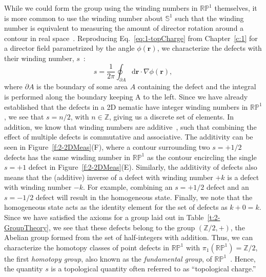 While we could form the group using the winding numbers in $\mathbb{R}\mathbb{P}^1$ themselves, it is more common to use the winding number about $\mathbb{S}^1$ such that the winding number is equivalent to measuring the amount of director rotation around a contour in real space~\cite{RN23,RN153,RN203}.
Reproducing Eq.~\ref{eq:1-topCharge} from Chapter~\ref{c:1} for a director field parametrized by the angle $\phi(\mathbf{r})$, we characterize the defects with their winding number, $s$~\cite{RN153,RN236}:
\begin{equation}
  s = \frac{1}{2 \pi}\oint_{\partial A} \textrm{d}\mathbf{r} \cdot \nabla\phi(\mathbf{r}),\label{eq:2-topCharge}
\end{equation}
where $\partial A$ is the boundary of some area $A$ containing the defect and the integral is performed along the boundary keeping A to the left.
Since we have already established that the defects in a 2D nematic have integer winding numbers in $\mathbb{R}\mathbb{P}^1$, we see that $s = n/2$, with $n \in \mathbb{Z}$, giving us a discrete set of elements.
In addition, we know that winding numbers are additive~\cite{RN196}, such that combining the effect of multiple defects is commutative and associative.
The additivity can be seen in Figure~\ref{f:2-2DMeas}(F), where a contour surrounding two $s = +1/2$ defects has the same winding number in $\mathbb{R}\mathbb{P}^1$ as the contour encircling the single $s = +1$ defect in Figure~\ref{f:2-2DMeas}(E).
Similarly, the additivity of defects also means that the (additive) inverse of a defect with winding number $+k$ is a defect with winding number $-k$.
For example, combining an $s = +1/2$ defect and an $s = -1/2$ defect will result in the homogeneous state.
Finally, we note that the homogeneous state acts as the identity element for the set of defects as $k + 0 = k$.
Since we have satisfied the axioms for a group laid out in Table~\ref{t:2-GroupTheory}, we see that these defects belong to the group $(\mathbb{Z}/2, +)$, the Abelian group formed from the set of half-integers with addition.
Thus, we can characterize the homotopy classes of point defects in $\mathbb{R}\mathbb{P}^1$ with $\pi_1 (\mathbb{R}\mathbb{P}^1) = \mathbb{Z}/2$, the first \emph{homotopy group}, also known as the \emph{fundamental group}, of $\mathbb{R}\mathbb{P}^1$~\cite{RN196,RN153,RN236}.
Hence, the quantity $s$ is a topological quantity often referred to as ``topological charge.''

